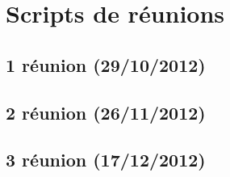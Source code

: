 \documentclass[french]{report}
\begin{document}
\chapter{Scripts de réunions}
\section*{1\iere{} réunion (29/10/2012)}
\label{reunion1}

\section*{2\ieme{} réunion (26/11/2012)}

\section*{3\ieme{} réunion (17/12/2012)}

\end{document}
